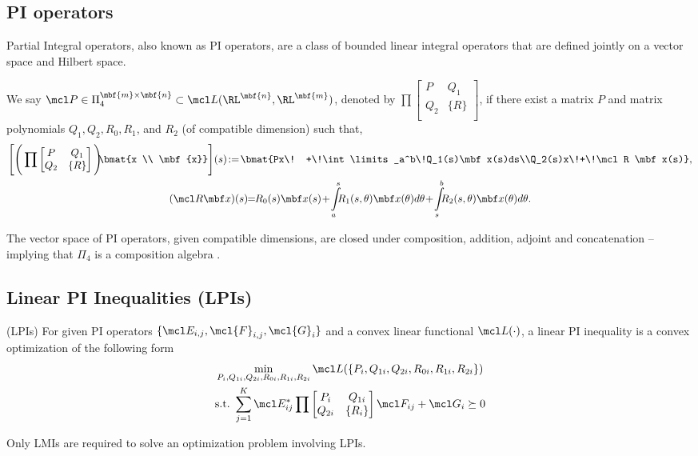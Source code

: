 \subsection{PI operators}
Partial Integral operators, also known as PI operators, are a class of bounded linear integral operators that are defined jointly on a vector space and Hilbert space.
\begin{definition}
	We say $\mcl P \in {\Pi}_4^{\mbf{m}\times\mbf{n}} \subset \mcl L(\RL^\mbf{n}, \RL^\mbf{m})$, denoted by $\prod \begin{bmatrix}
			P   & Q_1   \\
			Q_2 & \{R\} \\
		\end{bmatrix}$, if there exist a matrix $P$ and matrix polynomials $Q_1, Q_2, R_0, R_1$, and $R_2$ (of compatible dimension) such that,
	\begin{gather*}
		\Bigg[\Bigg(\prod \begin{bmatrix}
				P   & Q_1   \\
				Q_2 & \{R\} \\
			\end{bmatrix}\Bigg)\! \! \bmat{x \\ \mbf{x}}\Bigg](s)\! :=\! \bmat{Px\! +\!\int\limits_a^b\!Q_1(s)\mbf x(s)ds\\Q_2(s)x\!+\!\mcl R \mbf x(s)},\\
		(\mcl R \mbf x)(s)\!\! =\!\! R_0(s)\mbf x(s)\! +\! \int\limits_a^s\!\!\!R_1(s,\theta)\mbf x(\theta)d\theta\! +\!\int\limits_s^b\!\!\!R_2(s,\theta)\mbf x(\theta) d\theta.
	\end{gather*}

\end{definition}
The vector space of PI operators, given compatible dimensions, are closed under composition, addition, adjoint and concatenation -- implying that ${\Pi}_4$ is a composition algebra \cite{shivakumar2024GDPE}.

\subsection{Linear PI Inequalities (LPIs)}
\begin{definition}(LPIs)
	\label{def_LPI}
	For given PI operators $\{\mcl E_{i,j}, \mcl{F}_{i,j}, \mcl{G}_i\}$ and a convex linear functional $\mcl L(\cdot)$, a linear PI inequality is a convex optimization of the following form
	\begin{align}
		 & \min\limits_{P_i, Q_{1i}, Q_{2i}, R_{0i}, R_{1i}, R_{2i}}  \mcl L(\{P_i, Q_{1i}, Q_{2i}, R_{0i}, R_{1i}, R_{2i}\})\notag \\
		 & \mathrm{s. t. }\ \sum\limits_{j = 1}^K \mcl E_{ij}^*\prod \begin{bmatrix}
			                                                             P_i    & Q_{1i}  \\
			                                                             Q_{2i} & \{R_i\} \\
		                                                             \end{bmatrix}\mcl F_{ij} +\mcl G_i \succeq 0
	\end{align}
\end{definition}
Only LMIs are required to solve an optimization problem involving LPIs.
